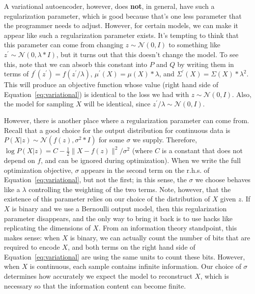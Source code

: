 \documentclass[a4paper, 11pt]{article} %
\begin{document}
A variational autoencoder, however, does \textbf{not}, in general, have such a regularization parameter, which is good because that's one less parameter that the programmer needs to adjust.
However, for certain models, we can make it appear like such a regularization parameter exists.
It's tempting to think that this parameter can come from changing $z\sim\mathcal{N}(0,I)$ to something like $z^{\prime}\sim\mathcal{N}(0,\lambda*I)$, but it turns out that this doesn't change the model.
To see this, note that we can absorb this constant into $P$ and $Q$ by writing them in terms of $f^{\prime}(z^{\prime})=f(z^{\prime}/\lambda)$, $\mu^{\prime}(X)=\mu(X)*\lambda$, and $\Sigma^{\prime}(X)=\Sigma(X)*\lambda^2$.
This will produce an objective function whose value (right hand side of Equation~\ref{eq:variational}) is identical to the loss we had with $z\sim\mathcal{N}(0,I)$.
Also, the model for sampling $X$ will be identical, since $z^{\prime}/\lambda\sim\mathcal{N}(0,I)$.  

However, there is another place where a regularization parameter can come from.
Recall that a good choice for the output distribution for continuous data is $P(X|z)\sim\mathcal{N}(f(z),\sigma^2 * I)$ for some $\sigma$ we supply.
Therefore, $\log P(X|z)=C-\frac{1}{2}\|X-f(z)\|^{2}/\sigma^2$ (where $C$ is a constant that does not depend on $f$, and can be ignored during optimization).
When we write the full optimization objective, $\sigma$ appears in the second term on the r.h.s. of Equation~\ref{eq:variational}, but not the first; in this sense, the $\sigma$ we choose behaves like a $\lambda$ controlling the weighting of the two terms.
Note, however, that the existence of this parameter relies on our choice of the distribution of $X$ given $z$.
If $X$ is binary and we use a Bernoulli output model, then this regularization parameter disappears, and the only way to bring it back is to use hacks like replicating the dimensions of $X$.
From an information theory standpoint, this makes sense: when $X$ is binary, we can actually count the number of bits that are required to encode $X$, and both terms on the right hand side of Equation~\ref{eq:variational} are using the same units to count these bits.
However, when $X$ is continuous, each sample contains infinite information.
Our choice of $\sigma$ determines how accurately we expect the model to reconstruct $X$, which is necessary so that the information content can become finite.
\end{document}
